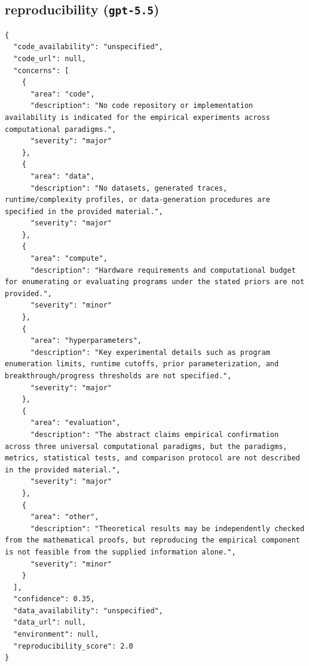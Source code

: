 \documentclass[11pt]{article}
\begin{document}
\subsection*{reproducibility (\texttt{gpt-5.5})}
\begin{verbatim}
{
  "code_availability": "unspecified",
  "code_url": null,
  "concerns": [
    {
      "area": "code",
      "description": "No code repository or implementation availability is indicated for the empirical experiments across computational paradigms.",
      "severity": "major"
    },
    {
      "area": "data",
      "description": "No datasets, generated traces, runtime/complexity profiles, or data-generation procedures are specified in the provided material.",
      "severity": "major"
    },
    {
      "area": "compute",
      "description": "Hardware requirements and computational budget for enumerating or evaluating programs under the stated priors are not provided.",
      "severity": "minor"
    },
    {
      "area": "hyperparameters",
      "description": "Key experimental details such as program enumeration limits, runtime cutoffs, prior parameterization, and breakthrough/progress thresholds are not specified.",
      "severity": "major"
    },
    {
      "area": "evaluation",
      "description": "The abstract claims empirical confirmation across three universal computational paradigms, but the paradigms, metrics, statistical tests, and comparison protocol are not described in the provided material.",
      "severity": "major"
    },
    {
      "area": "other",
      "description": "Theoretical results may be independently checked from the mathematical proofs, but reproducing the empirical component is not feasible from the supplied information alone.",
      "severity": "minor"
    }
  ],
  "confidence": 0.35,
  "data_availability": "unspecified",
  "data_url": null,
  "environment": null,
  "reproducibility_score": 2.0
}
\end{verbatim}
\end{document}
